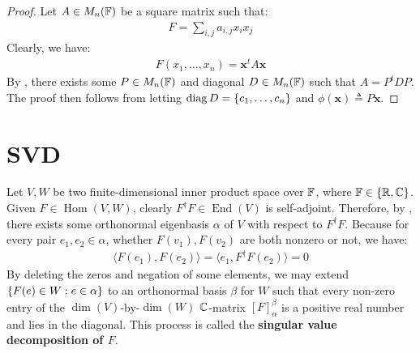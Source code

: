 \documentclass{report}
\begin{document}
\begin{proof}
Let $A \in M_n(\mathbb{F})$ be a square matrix such that: 
\begin{align*}
F= \sum_{i,j} a_{i,j}x_ix_j
\end{align*}
Clearly, we have: 
\begin{align*}
F(x_1,\dots ,x_n)= \textbf{x}^t A  \textbf{x}
\end{align*}
By , there exists some $P \in M_n(\mathbb{F})$ and diagonal $D \in M_n(\mathbb{F})$ such that  $A=P^t D P$. The proof then follows from letting $\operatorname{diag}D= \left\{ c_1,\dots ,c_n \right\}$ and $\phi (\textbf{x})\triangleq P \textbf{x}$. 
\end{proof}
\section{SVD}
\label{SVD}
Let $V,W$ be two finite-dimensional inner product space over $\mathbb{F}$, where $\mathbb{F}\in \left\{ \mathbb{R},\mathbb{C} \right\}$. Given $F\in \operatorname{Hom}(V,W)$, clearly $F^{\dagger }F\in \operatorname{End}(V)$ is self-adjoint. Therefore, by , there exists some orthonormal eigenbasis $\alpha  $ of $V$ with respect to $F^{\dagger }F$. Because for every pair $e_1,e_2 \in \alpha  $, whether $F(v_1),F(v_2)$ are both nonzero or not, we have: 
\begin{align*}
\langle F(e_1),F(e_2)\rangle  = \langle e_1, F^{\dagger } F(e_2)\rangle = 0
\end{align*}
By deleting the zeros and negation of some elements, we may extend $\left\{ F(e)\in W: e \in \alpha   \right\}$ to an orthonormal basis $\beta$ for $W$ such that every non-zero entry of the $\operatorname{dim}(V)$-by-$\operatorname{dim}(W)$ $\mathbb{C}$-matrix $[F]_{\alpha }^\beta $  is a positive real number and lies in the diagonal. This process is called the \textbf{singular value decomposition of $F$}.  
\end{document}
